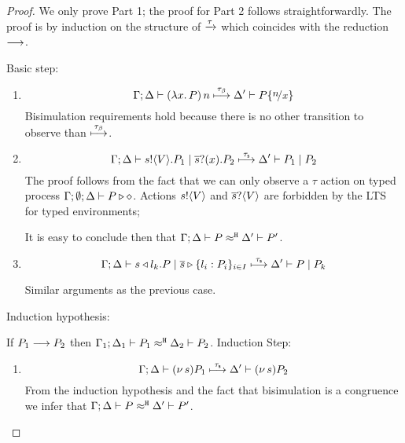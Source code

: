 
\begin{proof}
	\noi 
	We only prove Part 1; the proof for Part 2 follows straightforwardly.
	The proof is by induction on the structure of $\xrightarrow{\tau}$
	which coincides with the reduction $\longrightarrow$.

	\noi Basic step: 
	\begin{enumerate}
		\item %
		\[
			\horel{\Gamma}{\Delta}{\appl{(\abs{x}{P})}{n}}{\hby{\btau}}{\Delta'}{P \subst{n}{x}}
		\]
		\noi Bisimulation requirements hold because there is no other transition to observe than ${\stackrel{\tau_{\beta}}{\longmapsto}}$.

		\item %
		\[
			\Gamma; \Delta \vdash s ! \langle V \rangle . P_1 \;|\; \overline{s} ? (x) . P_2 \stackrel{\tau_{\mathsf{s}}}{\longmapsto} \Delta' \vdash P_1 \;|\; P_2
		\]
		\noi The proof follows from the fact that we can only observe a $\tau$
		action on typed process
		$\Gamma; \emptyset; \Delta \vdash P \triangleright \diamond$.
		Actions $s ! \langle V \rangle$ and $\overline{s} ? \langle V \rangle$
		are forbidden by the LTS for typed environments;

		\noi It is easy to conclude then that $\Gamma; \Delta \vdash P \approx^\mathtt{H} \Delta' \vdash P'$.

		\item %
			\[
				\Gamma; \Delta \vdash s \triangleleft l_k . P \;|\; \overline{s} \triangleright \{l_i: P_i\}_{i \in I} \stackrel{\tau_{\mathsf{s}}}{\longmapsto} \Delta' \vdash P \;|\; P_k
			\]

		\noi Similar arguments as the previous case.
	\end{enumerate}
	
	\noi Induction hypothesis:

	\noi If $P_1 \longrightarrow P_2$ then $\Gamma_1; \Delta_1 \vdash P_1 \approx^\mathtt{H} \Delta_2 \vdash P_2$.
	\noi Induction Step:
	\begin{enumerate}
		\item %
		\[
			\Gamma; \Delta \vdash (\nu\, s){P_1} \stackrel{\tau_{\mathsf{s}}}{\longmapsto} \Delta' \vdash (\nu\, s) P_2
		\]
		\noi From the induction hypothesis and the fact that bisimulation is a congruence
		we infer that $\Gamma; \Delta \vdash P \approx^\mathtt{H} \Delta' \vdash P'$.


\end{enumerate}
\end{proof}
